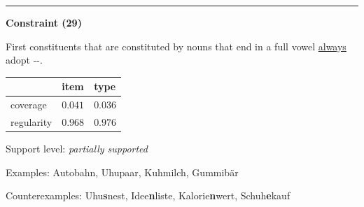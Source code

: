 \hrule




\vspace{0.4em}

\begin{center}
\textbf{Constraint (29)}
\end{center}

\noindent
First constituents that are constituted by nouns that end in a full vowel \underline{always} adopt \mbox{-{\zeroLinker}-}.
\vspace{0.35em}


\vspace{-0.35em}

\begin{table}[!ht]
\begin{center}

\begin{tabularx}{\columnwidth}{|X|X|X|}
\hline
 & item & type \\
\hline
 coverage & $0.041$ & $0.036$ \\
\hline
 regularity & $0.968$ & $0.976$ \\
\hline
\end{tabularx}
\end{center}
\end{table}

\vspace{-1.35em}

\noindent
Support level: \textit{partially supported}

\vspace{0.3em}

\noindent
Examples: Auto{\zeroLinker}bahn, Uhu{\zeroLinker}paar, Kuh{\zeroLinker}milch, Gummi{\zeroLinker}bär

\noindent
Counterexamples: Uhu\textbf{s}nest, Idee\textbf{n}liste, Kalorie\textbf{n}wert, Schuh\textbf{e}kauf

\vspace{0.3em}

